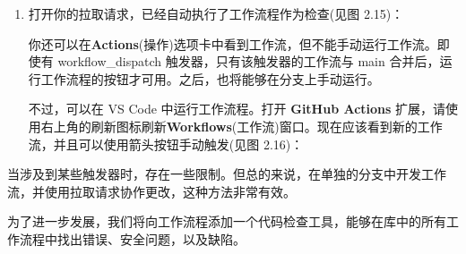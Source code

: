 \begin{enumerate}
\begin{shell}
$ git push -u origin new-workflow
\end{shell}

\item 
接下来，我们将为新分支创建一个拉取请求。因为使用了 pull\_request 触发器，这将自动运行新工作流。在浏览器中转到库并导航到 \textbf{Pull requests}(拉取请求)。Git 检测到已经推送了一个新分支，并会提供给创建拉取请求的选项(比较 \& 拉取请求，见图 2.13)：

\myGraphic{0.6}{content/chapter2/images/13.png}{图2.13 --- 浏览器中创建一个新的拉取请求}

只需保留默认标题(你之前添加的提交信息)然后点击 、\textbf{Create pull request}(创建拉取请求)(见图 2.14)：

\myGraphic{0.6}{content/chapter2/images/14.png}{图2.14 --- 创建一个带有标题和描述的拉取请求}

也可以使用 GitHub CLI 创建拉取请求：

\begin{shell}
$ gh pr create --fill
\end{shell}

\begin{myTip}{GitHub CLI}
在本书中，将大量使用 GitHub CLI (\url{https://cli.github.com/})，其适用于所有平台，可以通过许多包管理器(Homebrew、WinGet、RPM 等)获取。有关更多安装说明，请参阅 \url{https://github.com/cli/cli#installation}。安装后，需要使用 \verb|gh auth login| 进行身份验证(请参阅 \url{https://cli.github.com/manual/gh_auth_login})。
\end{myTip}

\item 
打开你的拉取请求，已经自动执行了工作流程作为检查(见图 2.15)：


你还可以在\textbf{Actions}(操作)选项卡中看到工作流，但不能手动运行工作流。即使有 workflow\_dispatch 触发器，只有该触发器的工作流与 main 合并后，运行工作流程的按钮才可用。之后，也将能够在分支上手动运行。

不过，可以在 VS Code 中运行工作流程。打开 \textbf{GitHub Actions} 扩展，请使用右上角的刷新图标刷新\textbf{Workflows}(工作流)窗口。现在应该看到新的工作流，并且可以使用箭头按钮手动触发(见图 2.16)：

\end{enumerate}


当涉及到某些触发器时，存在一些限制。但总的来说，在单独的分支中开发工作流，并使用拉取请求协作更改，这种方法非常有效。


为了进一步发展，我们将向工作流程添加一个代码检查工具，能够在库中的所有工作流程中找出错误、安全问题，以及缺陷。